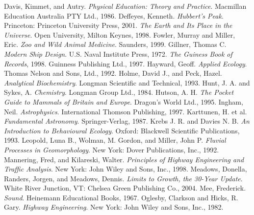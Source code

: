 \documentclass[10pt,]{book}
\theoremstyle{plain}
\theoremstyle{definition}
\theoremstyle{definition}
\theoremstyle{definition}
\numberwithin{equation}{part}
\begin{document}
\begin{referencelist}
\hypertarget{biblio-17}{}Davis, Kimmet, and Autry. \textit{Physical Education: Theory and Practice}. Macmillan Education Australia PTY Ltd., 1986.
\hypertarget{biblio-18}{}Deffeyes, Kenneth. \textit{Hubbert's Peak}. Princeton: Princeton University Press, 2001.
\hypertarget{biblio-19}{}\textit{The Earth and Its Place in the Universe}. Open University, Milton Keynes, 1998.
\hypertarget{biblio-20}{}Fowler, Murray and Miller, Eric. \textit{Zoo and Wild Animal Medicine}. Saunders, 1999.
\hypertarget{biblio-21}{}Gillner, Thomas C. \textit{Modern Ship Design}. U.S. Naval Institute Press, 1972.
\hypertarget{biblio-22}{}\textit{The Guiness Book of Records}, 1998. Guinness Publishing Ltd., 1997.
\hypertarget{biblio-23}{}Hayward, Geoff. \textit{Applied Ecology}. Thomas Nelson and Sons, Ltd., 1992.
\hypertarget{biblio-24}{}Holme, David J., and Peck, Hazel. \textit{Analytical Biochemistry}. Longman Scientific and Technical, 1993.
\hypertarget{biblio-25}{}Hunt, J. A. and Sykes, A. \textit{Chemistry}. Longman Group Ltd., 1984.
\hypertarget{biblio-26}{}Hutson, A. H. \textit{The Pocket Guide to Mammals of Britain and Europe}. Dragon’s World Ltd., 1995.
\hypertarget{biblio-27}{}Ingham, Neil. \textit{Astrophysics}. International Thomson Publishing, 1997.
\hypertarget{biblio-28}{}Karttunen, H. et al. \textit{Fundamental Astronomy}. Springer-Verlag, 1987.
\hypertarget{biblio-29}{}Krebs J. R. and Davies N. B. \textit{An Introduction to Behavioural Ecology}. Oxford: Blackwell Scientific Publications, 1993.
\hypertarget{biblio-30}{}Leopold, Luna B., Wolman, M. Gordon, and Miller, John P. \textit{Fluvial Processes in Geomorphology}. New York: Dover Publications, Inc., 1992.
\hypertarget{biblio-31}{}Mannering, Fred, and Kilareski, Walter. \textit{Principles of Highway Engineering and Traffic Analysis}. New York: John Wiley and Sons, Inc., 1998.
\hypertarget{biblio-32}{}Meadows, Donella, Randers, Jorgen, and Meadows, Dennis. \textit{Limits to Growth, the 30-Year Update}. White River Junction, VT: Chelsea Green Publishing Co., 2004.
\hypertarget{biblio-33}{}Mee, Frederick. \textit{Sound}. Heinemann Educational Books, 1967.
\hypertarget{biblio-34}{}Oglesby, Clarkson and Hicks, R. Gary. \textit{Highway Engineering}. New York: John Wiley and Sons, Inc., 1982.

\end{referencelist}
\end{document}
